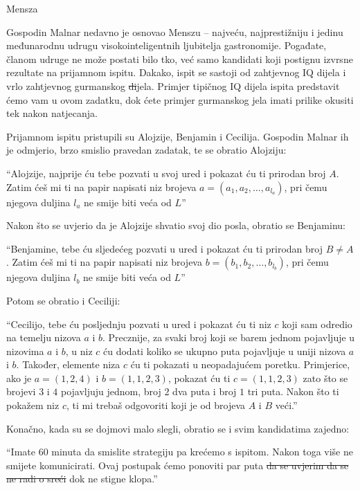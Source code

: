 \begin{statement}[
  problempoints=100,
  timelimit=1 sekunda,
  memorylimit=512 MiB,
]{Mensza}

Gospodin Malnar nedavno je osnovao Menszu -- najveću, najprestižniju i jedinu
međunarodnu udrugu visokointeligentnih ljubitelja gastronomije. Pogađate, članom
udruge ne može postati bilo tko, već samo kandidati koji postignu izvrsne
rezultate na prijamnom ispitu. Dakako, ispit se sastoji od zahtjevnog IQ dijela
i vrlo zahtjevnog gurmanskog \sout{di}jela. Primjer tipičnog IQ dijela ispita
predstavit ćemo vam u ovom zadatku, dok ćete primjer gurmanskog jela imati
prilike okusiti tek nakon natjecanja.

Prijamnom ispitu pristupili su Alojzije, Benjamin i Cecilija. Gospodin Malnar
ih je odmjerio, brzo smislio pravedan zadatak, te se obratio Alojziju:

``Alojzije, najprije ću tebe pozvati u svoj ured i pokazat ću ti prirodan
  broj $A$.  Zatim ćeš mi ti na papir napisati niz brojeva $a = (a_1, a_2,
\ldots, a_{l_a})$, pri čemu njegova duljina $l_a$ ne smije biti veća od $L$''

Nakon što se uvjerio da je Alojzije shvatio svoj dio posla, obratio se Benjaminu:

``Benjamine, tebe ću sljedećeg pozvati u ured i pokazat ću ti prirodan
  broj $B \ne A$.  Zatim ćeš mi ti na papir napisati niz brojeva $b = (b_1, b_2,
\ldots, b_{l_b})$, pri čemu njegova duljina $l_b$ ne smije biti veća od $L$''

Potom se obratio i Ceciliji:

``Cecilijo, tebe ću posljednju pozvati u ured i pokazat ću ti niz $c$ koji
sam odredio na temelju nizova $a$ i $b$. Precznije, za svaki broj koji se barem
jednom pojavljuje u nizovima $a$ i $b$, u niz $c$ ću dodati koliko se ukupno puta
pojavljuje u uniji nizova $a$ i $b$. Također, elemente niza $c$ ću ti pokazati u
neopadajućem poretku. Primjerice, ako je $a = (1, 2, 4)$ i $b = (1, 1, 2, 3)$,
pokazat ću ti $c = (1, 1, 2, 3)$ zato što se brojevi $3$ i $4$ pojavljuju jednom,
broj $2$ dva puta i broj $1$ tri puta. Nakon što ti pokažem niz $c$, ti mi trebaš
odgovoriti koji je od brojeva $A$ i $B$ veći.''

Konačno, kada su se dojmovi malo slegli, obratio se i svim kandidatima zajedno:

``Imate 60 minuta da smislite strategiju pa krećemo s ispitom. Nakon toga
više ne smijete komunicirati. Ovaj postupak ćemo ponoviti par puta
\sout{da se uvjerim da se ne radi o sreći} dok ne stigne klopa.''


\end{statement}
